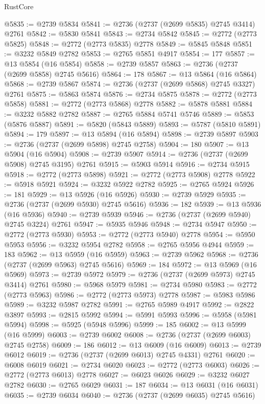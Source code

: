 \begin{lexlean}{RustCore}
\begin{coremodule}
@5835 := @2739 @5834
@5841 := @2736 (@2737 (@2699 @5835) @2745 @3414) @2761
@5842 := @5830 @5841
@5843 := @2734 @5842
@5845 := @2772 (@2773 @5825)
@5848 := @2772 (@2773 @5835) @2778
@5849 := @5845 @5848
@5851 := @3232 @5849 @2782
@5853 := @2765 @5851 @4917
@5854 := 177
@5857 := @13 @5854 (@16 @5854)
@5858 := @2739 @5857
@5863 := @2736 (@2737 (@2699 @5858) @2745 @5616)
@5864 := 178
@5867 := @13 @5864 (@16 @5864)
@5868 := @2739 @5867
@5874 := @2736 (@2737 (@2699 @5868) @2745 @3327) @2761
@5875 := @5863 @5874
@5876 := @2734 @5875
@5878 := @2772 (@2773 @5858)
@5881 := @2772 (@2773 @5868) @2778
@5882 := @5878 @5881
@5884 := @3232 @5882 @2782
@5887 := @2765 @5884 @5741 @5746
@5889 := @5853 (@5876 @5887)
@5891 := @5820 (@5843 @5889)
@5893 := @5787 (@5810 @5891)
@5894 := 179
@5897 := @13 @5894 (@16 @5894)
@5898 := @2739 @5897
@5903 := @2736 (@2737 (@2699 @5898) @2745 @2758)
@5904 := 180
@5907 := @13 @5904 (@16 @5904)
@5908 := @2739 @5907
@5914 := @2736 (@2737 (@2699 @5908) @2745 @3195) @2761
@5915 := @5903 @5914
@5916 := @2734 @5915
@5918 := @2772 (@2773 @5898)
@5921 := @2772 (@2773 @5908) @2778
@5922 := @5918 @5921
@5924 := @3232 @5922 @2782
@5925 := @2765 @5924
@5926 := 181
@5929 := @13 @5926 (@16 @5926)
@5930 := @2739 @5929
@5935 := @2736 (@2737 (@2699 @5930) @2745 @5616)
@5936 := 182
@5939 := @13 @5936 (@16 @5936)
@5940 := @2739 @5939
@5946 := @2736 (@2737 (@2699 @5940) @2745 @3224) @2761
@5947 := @5935 @5946
@5948 := @2734 @5947
@5950 := @2772 (@2773 @5930)
@5953 := @2772 (@2773 @5940) @2778
@5954 := @5950 @5953
@5956 := @3232 @5954 @2782
@5958 := @2765 @5956 @4944
@5959 := 183
@5962 := @13 @5959 (@16 @5959)
@5963 := @2739 @5962
@5968 := @2736 (@2737 (@2699 @5963) @2745 @5616)
@5969 := 184
@5972 := @13 @5969 (@16 @5969)
@5973 := @2739 @5972
@5979 := @2736 (@2737 (@2699 @5973) @2745 @3414) @2761
@5980 := @5968 @5979
@5981 := @2734 @5980
@5983 := @2772 (@2773 @5963)
@5986 := @2772 (@2773 @5973) @2778
@5987 := @5983 @5986
@5989 := @3232 @5987 @2782
@5991 := @2765 @5989 @4917
@5992 := @2822 @3897
@5993 := @2815 @5992
@5994 := @5991 @5993
@5996 := @5958 (@5981 @5994)
@5998 := @5925 (@5948 @5996)
@5999 := 185
@6002 := @13 @5999 (@16 @5999)
@6003 := @2739 @6002
@6008 := @2736 (@2737 (@2699 @6003) @2745 @2758)
@6009 := 186
@6012 := @13 @6009 (@16 @6009)
@6013 := @2739 @6012
@6019 := @2736 (@2737 (@2699 @6013) @2745 @4331) @2761
@6020 := @6008 @6019
@6021 := @2734 @6020
@6023 := @2772 (@2773 @6003)
@6026 := @2772 (@2773 @6013) @2778
@6027 := @6023 @6026
@6029 := @3232 @6027 @2782
@6030 := @2765 @6029
@6031 := 187
@6034 := @13 @6031 (@16 @6031)
@6035 := @2739 @6034
@6040 := @2736 (@2737 (@2699 @6035) @2745 @5616)

\end{coremodule}
\end{lexlean}
